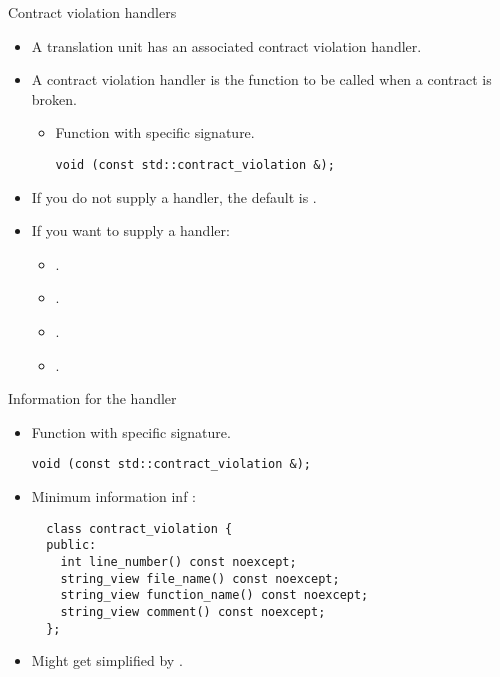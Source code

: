 \begin{frame}[t,fragile]{Contract violation handlers}
\begin{itemize}
  \item A translation unit has an associated contract violation handler.

  \vfill\pause
  \item A contract violation handler is the function to be called when a
contract is broken.
    \begin{itemize}
      \item Function with specific signature.
\begin{lstlisting}
void (const std::contract_violation &);
\end{lstlisting}
    \end{itemize}

  \vfill\pause
  \item If you do not supply a handler, the default is .

  \vfill\pause
  \item If you want to supply a handler:
    \pause
    \begin{itemize}[<+->]
      \item {}.
      \item {}.
      \item {}.
      \item {}.
    \end{itemize}

\end{itemize}
\end{frame}

\begin{frame}[t,fragile]{Information for the handler}
\begin{itemize}
  \item Function with specific signature.
\begin{lstlisting}
void (const std::contract_violation &);
\end{lstlisting}

  \vfill\pause
  \item Minimum information inf :
\begin{lstlisting}
  class contract_violation {
  public:
    int line_number() const noexcept;
    string_view file_name() const noexcept;
    string_view function_name() const noexcept;
    string_view comment() const noexcept;
  };
\end{lstlisting}

  \vfill\pause
  \item Might get simplified by .
\end{itemize}
\end{frame}

